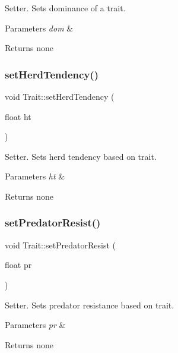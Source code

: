 Setter. Sets dominance of a trait. 
\begin{DoxyParams}{Parameters}
{\em dom} & \\
\hline
\end{DoxyParams}
\begin{DoxyReturn}{Returns}
none 
\end{DoxyReturn}
\mbox{\label{class_trait_ab5881ed05c689ee84de9997aa7243478}} 
\subsubsection{\texorpdfstring{set\+Herd\+Tendency()}{setHerdTendency()}}
{\footnotesize\ttfamily void Trait\+::set\+Herd\+Tendency (\begin{DoxyParamCaption}\item[{float}]{ht }\end{DoxyParamCaption})}

Setter. Sets herd tendency based on trait. 
\begin{DoxyParams}{Parameters}
{\em ht} & \\
\hline
\end{DoxyParams}
\begin{DoxyReturn}{Returns}
none 
\end{DoxyReturn}
\mbox{\label{class_trait_a952e008b31b2da8206319fd8b5bc4409}} 
\subsubsection{\texorpdfstring{set\+Predator\+Resist()}{setPredatorResist()}}
{\footnotesize\ttfamily void Trait\+::set\+Predator\+Resist (\begin{DoxyParamCaption}\item[{float}]{pr }\end{DoxyParamCaption})}

Setter. Sets predator resistance based on trait. 
\begin{DoxyParams}{Parameters}
{\em pr} & \\
\hline
\end{DoxyParams}
\begin{DoxyReturn}{Returns}
none 
\end{DoxyReturn}
\mbox{\label{class_trait_afb95de8d08b9e6509d670af19db03d9d}} 

